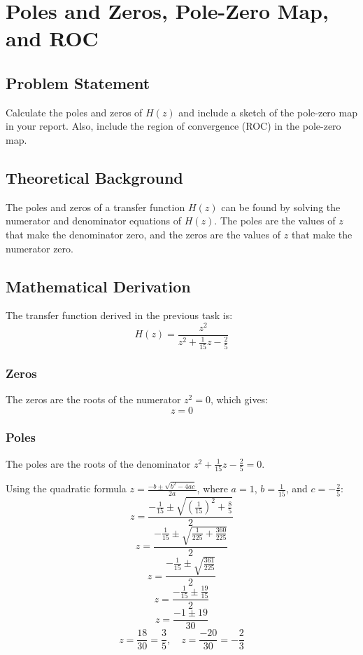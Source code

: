 \item[(d)]
\section{Poles and Zeros, Pole-Zero Map, and ROC}

\subsection*{Problem Statement}
Calculate the poles and zeros of \( H(z) \) and include a sketch of the pole-zero map in your report. Also, include the region of convergence (ROC) in the pole-zero map.

\subsection*{Theoretical Background}
The poles and zeros of a transfer function \( H(z) \) can be found by solving the numerator and denominator equations of \( H(z) \). The poles are the values of \( z \) that make the denominator zero, and the zeros are the values of \( z \) that make the numerator zero.

\subsection*{Mathematical Derivation}
The transfer function derived in the previous task is:
\[ H(z) = \frac{z^2}{z^2 + \frac{1}{15} z - \frac{2}{5}} \]

\subsubsection*{Zeros}
The zeros are the roots of the numerator \( z^2 = 0 \), which gives:
\[ z = 0 \]

\subsubsection*{Poles}
The poles are the roots of the denominator \( z^2 + \frac{1}{15} z - \frac{2}{5} = 0 \).

Using the quadratic formula \( z = \frac{-b \pm \sqrt{b^2 - 4ac}}{2a} \), where \( a = 1 \), \( b = \frac{1}{15} \), and \( c = -\frac{2}{5} \):
\[ z = \frac{-\frac{1}{15} \pm \sqrt{\left( \frac{1}{15} \right)^2 + \frac{8}{5}}}{2} \]
\[ z = \frac{-\frac{1}{15} \pm \sqrt{\frac{1}{225} + \frac{360}{225}}}{2} \]
\[ z = \frac{-\frac{1}{15} \pm \sqrt{\frac{361}{225}}}{2} \]
\[ z = \frac{-\frac{1}{15} \pm \frac{19}{15}}{2} \]
\[ z = \frac{-1 \pm 19}{30} \]
\[ z = \frac{18}{30} = \frac{3}{5}, \quad z = \frac{-20}{30} = -\frac{2}{3} \]

